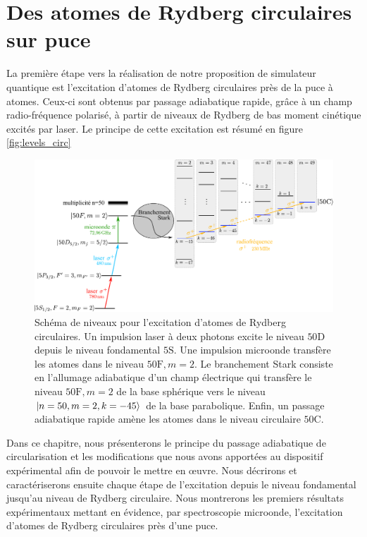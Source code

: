 \chapter{Des atomes de Rydberg circulaires sur puce}
\label{chapter:50c}
\vfill
\minitoc
\newpage

\noindent La première étape vers la réalisation de notre proposition de simulateur quantique est l'excitation d'atomes de Rydberg circulaires près de la puce à atomes.
Ceux-ci sont obtenus par passage adiabatique rapide, grâce à un champ radio-fréquence polarisé,  à partir de niveaux de Rydberg de bas moment cinétique excités par laser.
Le principe de cette excitation est résumé en figure \eqref{fig:levels_circ}

\begin{figure}[h]
\centering
\includegraphics[width=\linewidth]{figures/circulars/level_scheme_5S50C}
\caption[Schéma de niveaux pour l'excitation d'atomes de Rydberg circulaires]
{Schéma de niveaux pour l'excitation d'atomes de Rydberg circulaires.
Un impulsion laser à deux photons excite le niveau $\mathrm{50D}$ depuis le niveau fondamental $\mathrm{5S}$.
Une impulsion microonde transfère les atomes dans le niveau $\mathrm{50F},m=2$.
Le branchement Stark consiste en l'allumage adiabatique d'un champ électrique qui transfère le niveau $\mathrm{50F},m=2$ de la base sphérique vers le niveau $\ket{n=50,m=2,k=-45}$ de la base parabolique.
Enfin, un passage adiabatique rapide amène les atomes dans le niveau circulaire $\mathrm{50C}$.
}\label{fig:levels_circ}
\end{figure}

Dans ce chapitre, nous présenterons le principe du passage adiabatique de circularisation et les modifications que nous avons apportées au dispositif expérimental afin de pouvoir le mettre en \oe uvre.
Nous décrirons et caractériserons ensuite chaque étape de l'excitation depuis le niveau fondamental jusqu'au niveau de Rydberg circulaire.
Nous montrerons les premiers résultats expérimentaux mettant en évidence, par spectroscopie microonde, l'excitation d'atomes de Rydberg circulaires près d'une puce.

